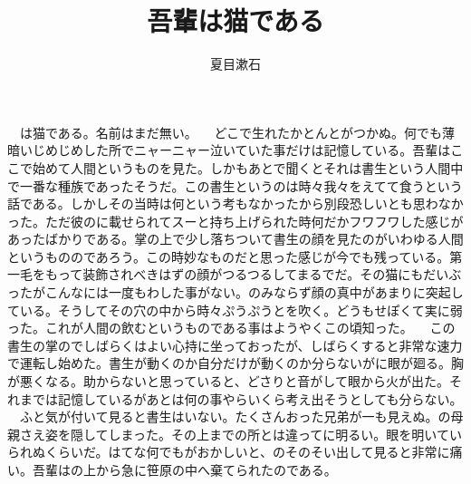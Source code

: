 \documentclass[a5j]{ltjbook}
\title{吾輩は猫である}
\author{夏目漱石}
\date{}
\begin{document}
　は猫である。名前はまだ無い。 \newline
　どこで生れたかとんとがつかぬ。何でも薄暗いじめじめした所でニャーニャー泣いていた事だけは記憶している。吾輩はここで始めて人間というものを見た。しかもあとで聞くとそれは書生という人間中で一番な種族であったそうだ。この書生というのは時々我々をえてて食うという話である。しかしその当時は何という考もなかったから別段恐しいとも思わなかった。ただ彼のに載せられてスーと持ち上げられた時何だかフワフワした感じがあったばかりである。掌の上で少し落ちついて書生の顔を見たのがいわゆる人間というもののであろう。この時妙なものだと思った感じが今でも残っている。第一毛をもって装飾されべきはずの顔がつるつるしてまるでだ。その猫にもだいぶったがこんなには一度もわした事がない。のみならず顔の真中があまりに突起している。そうしてその穴の中から時々ぷうぷうとを吹く。どうもせぽくて実に弱った。これが人間の飲むというものである事はようやくこの頃知った。 \newline
　この書生の掌のでしばらくはよい心持に坐っておったが、しばらくすると非常な速力で運転し始めた。書生が動くのか自分だけが動くのか分らないがに眼が廻る。胸が悪くなる。助からないと思っていると、どさりと音がして眼から火が出た。それまでは記憶しているがあとは何の事やらいくら考え出そうとしても分らない。 \newline
　ふと気が付いて見ると書生はいない。たくさんおった兄弟が一も見えぬ。の母親さえ姿を隠してしまった。その上までの所とは違ってに明るい。眼を明いていられぬくらいだ。はてな何でもがおかしいと、のそのそい出して見ると非常に痛い。吾輩はの上から急に笹原の中へ棄てられたのである。 \newline
\end{document}
